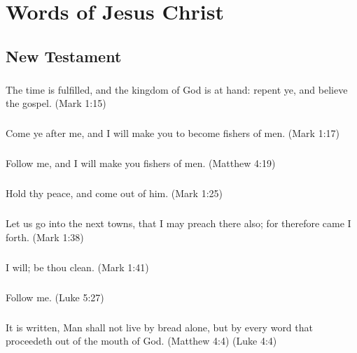 \chapter{Words of Jesus Christ}

\section{New Testament}

\paragraph{} The time is fulfilled, and the kingdom of God is at hand: repent ye, and believe the gospel. (Mark 1:15)

\paragraph{} Come ye after me, and I will make you to become fishers of men. (Mark 1:17)

\paragraph{} Follow me, and I will make you fishers of men. (Matthew 4:19)

\paragraph{} Hold thy peace, and come out of him. (Mark 1:25)

\paragraph{} Let us go into the next towns, that I may preach there also; for therefore came I forth. (Mark 1:38)

\paragraph{} I will; be thou clean. (Mark 1:41)

\paragraph{} Follow me. (Luke 5:27)

\paragraph{} It is written, Man shall not live by bread alone, but by every word that proceedeth out of the mouth of God. (Matthew 4:4) (Luke 4:4)

